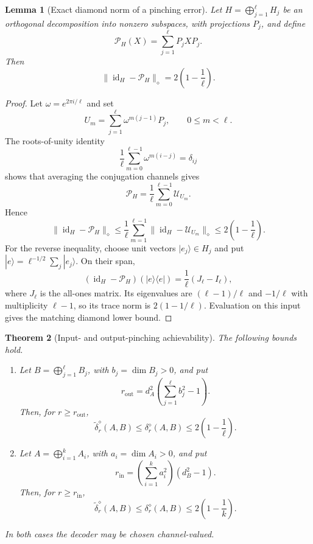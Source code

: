 \documentclass[11pt,a4paper]{article}
\theoremstyle{definition}
\theoremstyle{plain}
\newtheorem{theorem}{Theorem}[section]
\newtheorem{lemma}[theorem]{Lemma}
\theoremstyle{remark}
\begin{document}
\begin{lemma}[Exact diamond norm of a pinching error]
\label{lem:pinching-diamond}
Let $H=\bigoplus_{j=1}^{\ell}H_j$ be an orthogonal decomposition into
nonzero subspaces, with projections $P_j$, and define
\[
\mathcal P_H(X)=\sum_{j=1}^{\ell}P_jXP_j.
\]
Then
\[
\|\operatorname{id}_H-\mathcal P_H\|_\diamond
=2\left(1-\frac1\ell\right).
\]
\end{lemma}

\begin{proof}
Let $\omega=e^{2\pi i/\ell}$ and set
\[
U_m=\sum_{j=1}^{\ell}\omega^{m(j-1)}P_j,
\qquad 0\leq m<\ell.
\]
The roots-of-unity identity
\[
\frac1\ell\sum_{m=0}^{\ell-1}
\omega^{m(i-j)}=\delta_{ij}
\]
shows that averaging the conjugation channels gives
\[
\mathcal P_H=\frac1\ell\sum_{m=0}^{\ell-1}\mathcal U_{U_m}.
\]
Hence
\[
\|\operatorname{id}_H-\mathcal P_H\|_\diamond
\leq\frac1\ell\sum_{m=1}^{\ell-1}
\|\operatorname{id}_H-\mathcal U_{U_m}\|_\diamond
\leq2\left(1-\frac1\ell\right).
\]
For the reverse inequality, choose unit vectors $|e_j\rangle\in H_j$ and
put $|e\rangle=\ell^{-1/2}\sum_j|e_j\rangle$. On their span,
\[
(\operatorname{id}_H-\mathcal P_H)(|e\rangle\langle e|)
=\frac1\ell(J_\ell-I_\ell),
\]
where $J_\ell$ is the all-ones matrix. Its eigenvalues are
$(\ell-1)/\ell$ and $-1/\ell$ with multiplicity $\ell-1$, so its trace
norm is $2(1-1/\ell)$. Evaluation on this input gives the matching diamond
lower bound.
\end{proof}

\begin{theorem}[Input- and output-pinching achievability]
\label{thm:block-pinching-upper}
The following bounds hold.
\begin{enumerate}
\item Let $B=\bigoplus_{j=1}^{\ell}B_j$, with
$b_j=\dim B_j>0$, and put
\[
r_{\mathrm{out}}
=d_A^2\left(\sum_{j=1}^{\ell}b_j^2-1\right).
\]
Then, for $r\geq r_{\mathrm{out}}$,
\[
\widetilde\delta_r^\diamond(A,B)
\leq\delta_r^\diamond(A,B)
\leq2\left(1-\frac1\ell\right).
\]
\item Let $A=\bigoplus_{i=1}^{k}A_i$, with
$a_i=\dim A_i>0$, and put
\[
r_{\mathrm{in}}
=\left(\sum_{i=1}^{k}a_i^2\right)(d_B^2-1).
\]
Then, for $r\geq r_{\mathrm{in}}$,
\[
\widetilde\delta_r^\diamond(A,B)
\leq\delta_r^\diamond(A,B)
\leq2\left(1-\frac1k\right).
\]
\end{enumerate}
In both cases the decoder may be chosen channel-valued.
\end{theorem}
\end{document}
